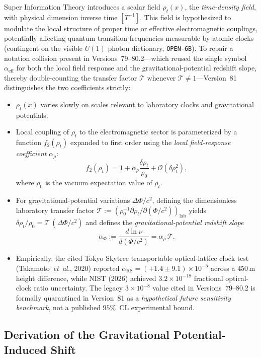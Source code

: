 Super Information Theory introduces a scalar field \(\rho_t(x)\), the \emph{time-density field}, with physical dimension inverse time \([T^{-1}]\). This field is hypothesized to modulate the local structure of proper time or effective electromagnetic couplings, potentially affecting quantum transition frequencies measurable by atomic clocks (contingent on the visible \(U(1)\) photon dictionary, \texttt{OPEN-6B}). To repair a notation collision present in Versions~79--80.2---which reused the single symbol \(\alpha_{\mathrm{eff}}\) for both the local field response and the gravitational-potential redshift slope, thereby double-counting the transfer factor \(\mathcal{T}\) whenever \(\mathcal{T} \ne 1\)---Version~81 distinguishes the two coefficients strictly:
\begin{itemize}
    \item \(\rho_t(x)\) varies slowly on scales relevant to laboratory clocks and gravitational potentials.
    \item Local coupling of \(\rho_t\) to the electromagnetic sector is parameterized by a function \(f_2(\rho_t)\) expanded to first order using the \emph{local field-response coefficient} \(\alpha_\rho\):
    \[
    f_2(\rho_t) = 1 + \alpha_\rho \frac{\delta \rho_t}{\rho_0} + \mathcal{O}(\delta \rho_t^2),
    \]
    where \(\rho_0\) is the vacuum expectation value of \(\rho_t\).
    \item For gravitational-potential variations \(\Delta\Phi/c^2\), defining the dimensionless laboratory transfer factor \(\mathcal{T} := (\rho_0^{-1}\partial\rho_t/\partial(\Phi/c^2))_{\mathrm{lab}}\) yields \(\delta\rho_t/\rho_0 = \mathcal{T}\,(\Delta\Phi/c^2)\) and defines the \emph{gravitational-potential redshift slope}
    \[
    \alpha_\Phi := \frac{d\ln\nu}{d(\Phi/c^2)} = \alpha_\rho\,\mathcal{T}.
    \]
    \item Empirically, the cited Tokyo Skytree transportable optical-lattice clock test (Takamoto~\emph{et~al.}, 2020) reported \(\alpha_{\mathrm{RS}} = (+1.4 \pm 9.1)\times 10^{-5}\) across a \(450\,\mathrm{m}\) height difference, while NIST (2026) achieved \(3.2\times 10^{-18}\) fractional optical-clock ratio uncertainty. The legacy \(3\times 10^{-8}\) value cited in Versions~79--80.2 is formally quarantined in Version~81 as a \emph{hypothetical future sensitivity benchmark}, not a published \(95\%\)~CL experimental bound.
\end{itemize}

\subsection{Derivation of the Gravitational Potential-Induced Shift}

